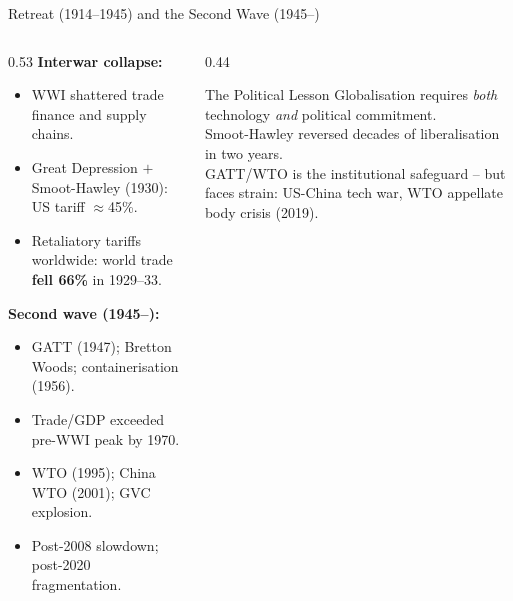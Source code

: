 \documentclass[aspectratio=169]{beamer}
\begin{document}
\begin{frame}{Retreat (1914--1945) and the Second Wave (1945--)}
\begin{columns}[T]
\begin{column}{0.53\textwidth}
\textbf{Interwar collapse:}
\begin{itemize}\small
  \item WWI shattered trade finance and supply chains.
  \item Great Depression $+$ Smoot-Hawley (1930): US tariff $\approx$45\%.
  \item Retaliatory tariffs worldwide: world trade \textbf{fell 66\%} in 1929--33.
\end{itemize}
\vspace{0.2em}
\textbf{Second wave (1945--):}
\begin{itemize}\small
  \item GATT (1947); Bretton Woods; containerisation (1956).
  \item Trade/GDP exceeded pre-WWI peak by 1970.
  \item WTO (1995); China WTO (2001); GVC explosion.
  \item Post-2008 slowdown; post-2020 fragmentation.
\end{itemize}
\end{column}
\begin{column}{0.44\textwidth}
\begin{insight}{The Political Lesson}
\footnotesize Globalisation requires \emph{both} technology \emph{and} political commitment.\\[0.3em]
Smoot-Hawley reversed decades of liberalisation in two years.\\[0.3em]
GATT/WTO is the institutional safeguard -- but faces strain: US-China tech war, WTO appellate body crisis (2019).
\end{insight}
\end{column}
\end{columns}
\end{frame}
\end{document}
